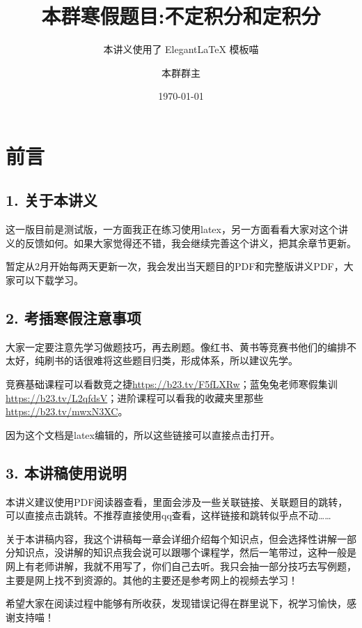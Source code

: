 \documentclass[lang=cn,newtx,10pt,scheme=chinese]{elegantbook}
\title{本群寒假题目:不定积分和定积分} %
\subtitle{本讲义使用了 Elegant\LaTeX{} 模板喵 }
\author{本群群主}
\institute{本群}
\date{\today}
\begin{document}
\maketitle
\frontmatter

\newpage

\section*{前言}

\subsection*{\textbf{1. 关于本讲义}}
这一版目前是测试版，一方面我正在练习使用latex，另一方面看看大家对这个讲义的反馈如何。如果大家觉得还不错，我会继续完善这个讲义，把其余章节更新。

暂定从2月开始每两天更新一次，我会发出当天题目的PDF和完整版讲义PDF，大家可以下载学习。

\subsection*{\textbf{2. 考插寒假注意事项}}
大家一定要注意先学习做题技巧，再去刷题。像红书、黄书等竞赛书他们的编排不太好，纯刷书的话很难将这些题目归类，形成体系，所以建议先学。

竞赛基础课程可以看数竞之捷\url{https://b23.tv/F5fLXRw}；蓝兔兔老师寒假集训\url{https://b23.tv/L2qfdsV}；进阶课程可以看我的收藏夹里那些\url{https://b23.tv/mwxN3XC}。

因为这个文档是latex编辑的，所以这些链接可以直接点击打开。

\subsection*{\textbf{3. 本讲稿使用说明}}
本讲义建议使用PDF阅读器查看，里面会涉及一些关联链接、关联题目的跳转，可以直接点击跳转。不推荐直接使用qq查看，这样链接和跳转似乎点不动……

关于本讲稿内容，我这个讲稿每一章会详细介绍每个知识点，但会选择性讲解一部分知识点，没讲解的知识点我会说可以跟哪个课程学，然后一笔带过，这种一般是网上有老师讲解，我就不用写了，你们自己去听。我只会抽一部分技巧去写例题，主要是网上找不到资源的。其他的主要还是参考网上的视频去学习！

希望大家在阅读过程中能够有所收获，发现错误记得在群里说下，祝学习愉快，感谢支持喵！
\newpage

\tableofcontents
\mainmatter


\newpage

\end{document}
